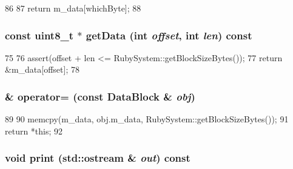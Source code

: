 \begin{DoxyCode}
86 {
87     return m_data[whichByte];
88 }
\end{DoxyCode}
\hypertarget{classDataBlock_ad7715bb129ad4df13d1503d40dff368b}{
\subsubsection[{getData}]{\setlength{\rightskip}{0pt plus 5cm}const uint8\_\-t $\ast$ getData (int {\em offset}, \/  int {\em len}) const}}
\label{classDataBlock_ad7715bb129ad4df13d1503d40dff368b}



\begin{DoxyCode}
75 {
76     assert(offset + len <= RubySystem::getBlockSizeBytes());
77     return &m_data[offset];
78 }
\end{DoxyCode}
\hypertarget{classDataBlock_a5a3faa4c9900c71dca129d15aefd10dd}{
\subsubsection[{operator=}]{ \& operator= (const {\bf DataBlock} \& {\em obj})}}
\label{classDataBlock_a5a3faa4c9900c71dca129d15aefd10dd}



\begin{DoxyCode}
89 {
90     memcpy(m_data, obj.m_data, RubySystem::getBlockSizeBytes());
91     return *this;
92 }
\end{DoxyCode}
\hypertarget{classDataBlock_ac55fe386a101fbae38c716067c9966a0}{
\subsubsection[{print}]{\setlength{\rightskip}{0pt plus 5cm}void print (std::ostream \& {\em out}) const}}
\label{classDataBlock_ac55fe386a101fbae38c716067c9966a0}



